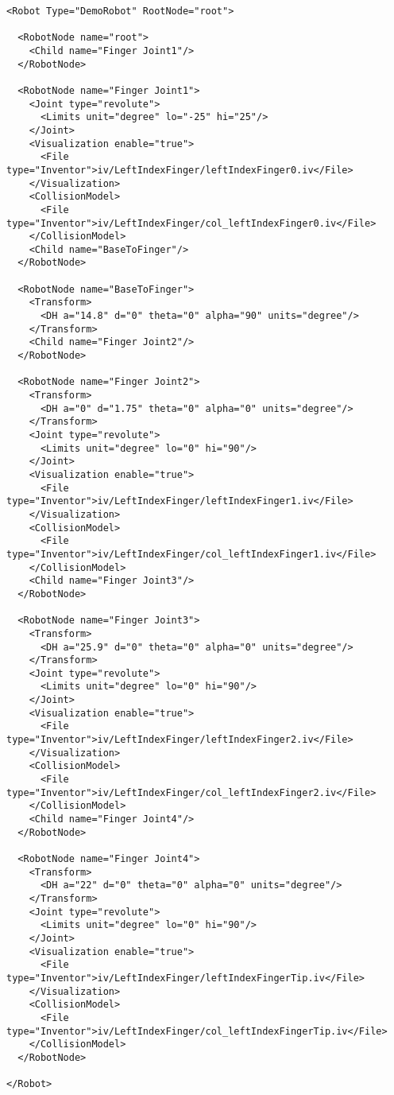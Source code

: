 \begin{lstlisting}
<Robot Type="DemoRobot" RootNode="root">

  <RobotNode name="root">
    <Child name="Finger Joint1"/>
  </RobotNode>

  <RobotNode name="Finger Joint1">
    <Joint type="revolute">
      <Limits unit="degree" lo="-25" hi="25"/>
    </Joint>
    <Visualization enable="true">
      <File type="Inventor">iv/LeftIndexFinger/leftIndexFinger0.iv</File>
    </Visualization>
    <CollisionModel>
      <File type="Inventor">iv/LeftIndexFinger/col_leftIndexFinger0.iv</File>
    </CollisionModel>
    <Child name="BaseToFinger"/>
  </RobotNode>

  <RobotNode name="BaseToFinger">
    <Transform>
      <DH a="14.8" d="0" theta="0" alpha="90" units="degree"/>
    </Transform>
    <Child name="Finger Joint2"/>
  </RobotNode>

  <RobotNode name="Finger Joint2">
    <Transform>
      <DH a="0" d="1.75" theta="0" alpha="0" units="degree"/>
    </Transform>
    <Joint type="revolute">
      <Limits unit="degree" lo="0" hi="90"/>
    </Joint>
    <Visualization enable="true">
      <File type="Inventor">iv/LeftIndexFinger/leftIndexFinger1.iv</File>
    </Visualization>
    <CollisionModel>
      <File type="Inventor">iv/LeftIndexFinger/col_leftIndexFinger1.iv</File>
    </CollisionModel>
    <Child name="Finger Joint3"/>
  </RobotNode>

  <RobotNode name="Finger Joint3">
    <Transform>
      <DH a="25.9" d="0" theta="0" alpha="0" units="degree"/>
    </Transform>
    <Joint type="revolute">
      <Limits unit="degree" lo="0" hi="90"/>
    </Joint>
    <Visualization enable="true">
      <File type="Inventor">iv/LeftIndexFinger/leftIndexFinger2.iv</File>
    </Visualization>
    <CollisionModel>
      <File type="Inventor">iv/LeftIndexFinger/col_leftIndexFinger2.iv</File>
    </CollisionModel>
    <Child name="Finger Joint4"/>
  </RobotNode>

  <RobotNode name="Finger Joint4">
    <Transform>
      <DH a="22" d="0" theta="0" alpha="0" units="degree"/>
    </Transform>
    <Joint type="revolute">
      <Limits unit="degree" lo="0" hi="90"/>
    </Joint>
    <Visualization enable="true">
      <File type="Inventor">iv/LeftIndexFinger/leftIndexFingerTip.iv</File>
    </Visualization>
    <CollisionModel>
      <File type="Inventor">iv/LeftIndexFinger/col_leftIndexFingerTip.iv</File>
    </CollisionModel>
  </RobotNode>

</Robot>
\end{lstlisting}
\par
